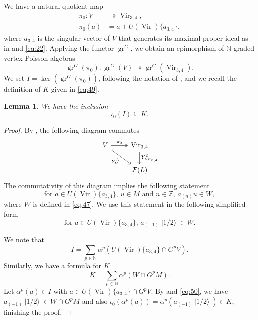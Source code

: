 \documentclass[a4paper, 12pt, reqno]{amsart}
\newtheorem{lemma}[theorem]{Lemma}
\theoremstyle{remark}
\DeclareMathOperator{\Vir}{Vir}
\DeclareMathOperator{\gr}{gr}
\DeclareMathOperator{\vachalf}{|1/2\rangle}
\begin{document}
We have a natural quotient map
\begin{align*}
  \pi_0: V &\twoheadrightarrow \Vir_{3, 4}, \\
  \pi_0(a) &= a + U(\Vir)\{a_{3, 4}\},
\end{align*}
where $a_{3, 4}$ is the singular vector of $V$ that generates its maximal proper ideal as in \cite{andrews_singular_2022} and \eqref{eq:22}.
Applying the functor $\gr^G$, we obtain an epimorphism of $\mathbb{N}$-graded vertex Poisson algebras
\begin{equation*}
  \gr^G(\pi_0): \gr^G(V) \twoheadrightarrow \gr^G(\Vir_{3, 4}).
\end{equation*}
We set $I = \ker(\gr^G(\pi_0))$, following the notation of \cite{andrews_singular_2022}, and we recall the definition of $K$ given in \eqref{eq:49}.

\begin{lemma}
  \label{lmm:36}
  We have the inclusion
  \begin{equation*}
    \iota_0(I) \subseteq K.
  \end{equation*}
\end{lemma}

\begin{proof}
  By , the following diagram commutes
  \begin{equation*}
    \begin{tikzcd}
      V \arrow[r, "\pi_0", two heads] \arrow[rd, "{Y^L_{V}}"'] & {\Vir_{3, 4}} \arrow[d, "{Y^L_{\Vir_{3, 4}}}"] \\
      & {\mathcal{F}(L)}
    \end{tikzcd}
  \end{equation*}
  The commutativity of this diagram implies the following statement
  \begin{equation*}
    \text{for $a \in U(\Vir)\{a_{3, 4}\}$, $u \in M$ and $n \in \mathbb{Z}$, $a_{(n)}u \in W$},
  \end{equation*}
  where $W$ is defined in \eqref{eq:47}.
  We use this statement in the following simplified form
  \begin{equation}
    \label{eq:50}
    \text{for $a \in U(\Vir)\{a_{3, 4}\}$, $a_{(-1)}\vachalf \in W$}.
  \end{equation}

  We note that
  \begin{equation*}
    I = \sum_{p \in \mathbb{N}}\alpha^p(U(\Vir)\{a_{3, 4}\} \cap G^pV).
  \end{equation*}
  Similarly, we have a formula for $K$
  \begin{equation*}
    K = \sum_{p \in \mathbb{N}}\alpha^p(W \cap G^pM).
  \end{equation*}
  Let $\alpha^p(a) \in I$ with $a \in U(\Vir)\{a_{3, 4}\} \cap G^pV$.
  By  and \eqref{eq:50}, we have $a_{(-1)}\vachalf \in W \cap G^pM$ and also $\iota_0(\alpha^p(a)) = \alpha^p(a_{(-1)}\vachalf) \in K$, finishing the proof.
\end{proof}
\end{document}
